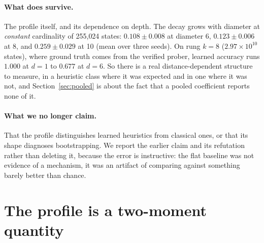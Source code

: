 \documentclass{article}
\begin{document}
\begin{table}[t]\centering
\caption{The strength control in full.}
\label{tab:strength}\end{table}

\paragraph{What does survive.} The profile itself, and its dependence on depth.
The decay grows with diameter at \emph{constant} cardinality of 255{,}024 states:
$0.108 \pm 0.008$ at diameter 6, $0.123 \pm 0.006$ at 8, and $0.259 \pm 0.029$ at
10 (mean over three seeds). On rung $k=8$ ($2.97\times10^{10}$ states), where
ground truth comes from the verified prober, learned accuracy runs $1.000$ at
$d=1$ to $0.677$ at $d=6$. So there is a real distance-dependent structure to
measure, in a heuristic class where it was expected and in one where it was not,
and Section~\ref{sec:pooled} is about the fact that a pooled coefficient reports
none of it.

\paragraph{What we no longer claim.} That the profile distinguishes learned
heuristics from classical ones, or that its shape diagnoses bootstrapping. We
report the earlier claim and its refutation rather than deleting it, because the
error is instructive: the flat baseline was not evidence of a mechanism, it was
an artifact of comparing against something barely better than chance.

\section{The profile is a two-moment quantity}
\label{sec:law}
\end{document}
